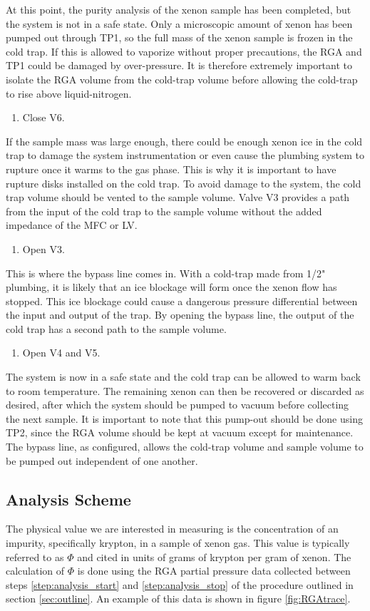 \documentclass[12pt]{article}
\begin{document}
\noindent At this point, the purity analysis of the xenon sample has been completed, but the system is not in a safe state. Only a microscopic amount of xenon has been pumped out through TP1, so the full mass of the xenon sample is frozen in the cold trap. If this is allowed to vaporize without proper precautions, the RGA and TP1 could be damaged by  over-pressure. It is therefore extremely important to isolate the RGA volume from the cold-trap volume before allowing the cold-trap to rise above liquid-nitrogen.
\begin{enumerate}[resume]
\item \label{step:analysis_stop} Close V6.
\end{enumerate}
\noindent If the sample mass was large enough, there could be enough xenon ice in the cold trap to damage the system instrumentation or even cause the plumbing system to rupture once it warms to the gas phase. This is why it is important to have rupture disks installed on the cold trap. To avoid damage to the system, the cold trap volume should be vented to the sample volume. Valve V3 provides a path from the input of the cold trap to the sample volume without the added impedance of the MFC or LV.
\begin{enumerate}[resume]
\item Open V3. 
\end{enumerate}
\noindent This is where the bypass line comes in. With a cold-trap made from 1/2" plumbing, it is likely that an ice blockage will form once the xenon flow has stopped. This ice blockage could cause a dangerous pressure differential between the input and output of the trap. By opening the bypass line, the output of the cold trap has a second path to the sample volume.
\begin{enumerate}[resume]
\item Open V4 and V5. 
\end{enumerate}

The system is now in a safe state and the cold trap can be allowed to warm back to room temperature. The remaining xenon can then be recovered or discarded as desired, after which the system should be pumped to vacuum before collecting the next sample. It is important to note that this pump-out should be done using TP2, since the RGA volume should be kept at vacuum except for maintenance. The bypass line, as configured, allows the cold-trap volume and sample volume to be pumped out independent of one another.

\subsection{Analysis Scheme}
The physical value we are interested in measuring is the concentration of an impurity, specifically krypton, in a sample of xenon gas. This value is typically referred to as $\Phi$ and cited in units of grams of krypton per gram of xenon. The calculation of $\Phi$ is done using the RGA partial pressure data collected between steps \ref{step:analysis_start} and \ref{step:analysis_stop} of the procedure outlined in section \ref{sec:outline}. An example of this data is shown in figure \ref{fig:RGAtrace}. 
\end{document}
